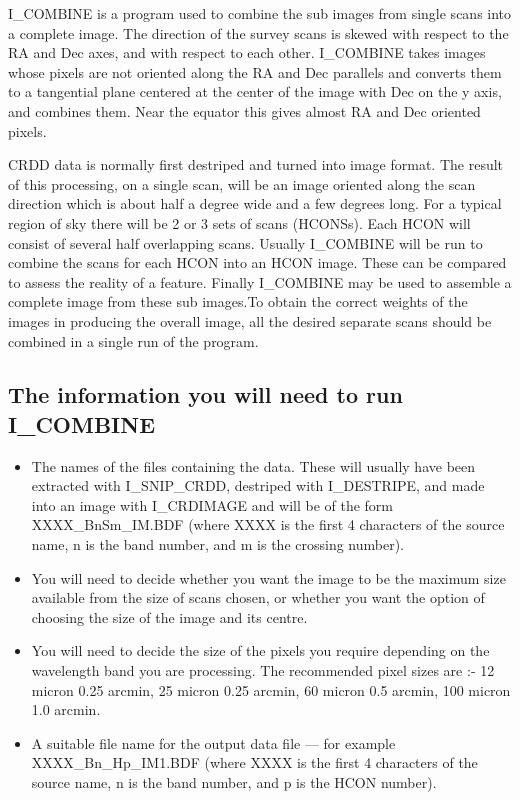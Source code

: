 \documentclass[nolof,noabs,11pt]{starlink}
\begin{document}
I\_COMBINE is a program used to combine the sub images from single scans into a
complete image. The direction of the survey scans is skewed with respect to the
RA and Dec axes, and with respect to each other. I\_COMBINE takes images whose
pixels are not oriented along the RA and Dec parallels and converts them to a
tangential plane centered at the center of the image with Dec on the y axis,
and combines them. Near the equator this gives almost RA and Dec oriented
pixels.

CRDD data is normally first destriped and turned into image format. The result
of this processing, on a single scan, will be an image oriented along the scan
direction which is about half a degree wide and a few degrees long. For a
typical region of sky there will be 2 or 3 sets of scans (HCONSs). Each HCON
will consist of several half overlapping scans. Usually  I\_COMBINE will be run
to combine the scans for each HCON into an HCON image.
These can be compared to assess the reality
of a feature. Finally I\_COMBINE may be used to assemble a complete image from
these sub images.To obtain the correct weights of the images in producing the
overall image, all the desired separate scans should be combined in a single
run of the program.


\subsection {The information you will need to run I\_COMBINE}

\begin{itemize}
\item The names of the files containing the data. These will usually have been
extracted with I\_SNIP\_CRDD, destriped with I\_DESTRIPE, and made into an
image with I\_CRDIMAGE and will be of the form XXXX\_BnSm\_IM.BDF (where XXXX
is the first 4 characters of the source name, n is the band number, and m is
the crossing number).

\item You will need to decide whether you want the image to be the maximum size
available from the size of scans chosen, or whether you want the option of
choosing the size of the image and its centre.

\item You will need to decide the size of the pixels you require depending
on the wavelength band you are processing. The recommended pixel sizes are :-
12 micron  0.25 arcmin, 25 micron  0.25 arcmin, 60 micron   0.5 arcmin,
100 micron  1.0 arcmin.

\item A suitable file name for the output data file --- for example
XXXX\_Bn\_Hp\_IM1.BDF (where XXXX is the first 4 characters of the source
name, n is the band number, and p is the HCON number).

\end {itemize}
\end{document}
